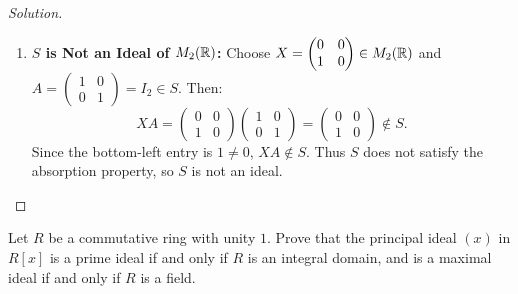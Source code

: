 \begin{proof}[Solution]
\begin{enumerate}[label=\arabic*., leftmargin=*]
    \item \textbf{$S$ is Not an Ideal of $M_2(\mathbb{R})$:}
    Choose $X = \begin{pmatrix} 0 & 0 \\ 1 & 0 \end{pmatrix} \in M_2(\mathbb{R})$ and $A = \begin{pmatrix} 1 & 0 \\ 0 & 1 \end{pmatrix} = I_2 \in S$.
    Then:
    \begin{equation*}
    XA = \begin{pmatrix} 0 & 0 \\ 1 & 0 \end{pmatrix} \begin{pmatrix} 1 & 0 \\ 0 & 1 \end{pmatrix} = \begin{pmatrix} 0 & 0 \\ 1 & 0 \end{pmatrix} \notin S.
    \end{equation*}
    Since the bottom-left entry is $1 \ne 0$, $XA \notin S$.
    Thus $S$ does not satisfy the absorption property, so $S$ is not an ideal.
\end{enumerate}
\end{proof}

\begin{problem}
Let $R$ be a commutative ring with unity $1$. Prove that the principal ideal $(x)$ in $R[x]$ is a prime ideal if and only if $R$ is an integral domain, and is a maximal ideal if and only if $R$ is a field.
\end{problem}

